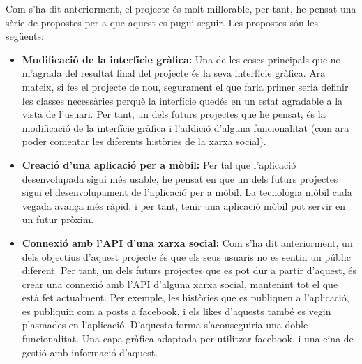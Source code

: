 \documentclass[11pt,catalan,listoffigures,listoftables]{tfgetsinf}
\begin{document}
Com s'ha dit anteriorment, el projecte és molt millorable, per tant, he pensat una sèrie de propostes per a que aquest es pugui seguir. Les propostes són les següents:
\begin{itemize}
\item \textbf{Modificació de la interfície gràfica:} Una de les coses principals que no m'agrada del resultat final del projecte és la seva interfície gràfica. Ara mateix, si fes el projecte de nou, segurament el que faria primer seria definir les classes necessàries perquè la interfície quedés en un estat agradable a la vista de l'usuari. Per tant, un dels futurs projectes que he pensat, és la modificació de la interfície gràfica i l'addició d'alguna funcionalitat (com ara poder comentar les diferents històries de la xarxa social).
\item \textbf{Creació d'una aplicació per a mòbil:} Per tal que l'aplicació desenvolupada sigui més usable, he pensat en que un dels futurs projectes sigui el desenvolupament de l'aplicació per a mòbil. La tecnologia mòbil cada vegada avança més ràpid, i per tant, tenir una aplicació mòbil pot servir en un futur pròxim.
\item \textbf{Connexió amb l'API d'una xarxa social:} Com s'ha dit anteriorment, un dels objectius d'aquest projecte és que els seus usuaris no es sentin un públic diferent. Per tant, un dels futurs projectes que es pot dur a partir d'aquest, és crear una connexió amb l'API d'alguna xarxa social, mantenint tot el que està fet actualment. Per exemple, les històries que es publiquen a l'aplicació, es publiquin com a posts a facebook, i els likes d'aquests també es vegin plasmades en l'aplicació. D'aquesta forma s'aconseguiria una doble funcionalitat. Una capa gràfica adaptada per utilitzar facebook, i una eina de gestió amb informació d'aquest.
\end{itemize}

\end{document}
